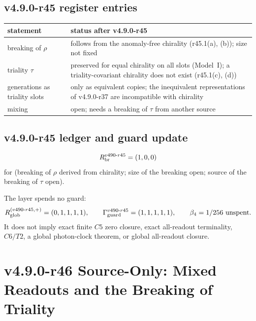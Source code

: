 \subsection*{v4.9.0-r45 register entries}
\label{subsec:v490-r45-register}

\begin{center}
\small
\begin{tabular}{@{}>{\raggedright\arraybackslash}p{}>{\raggedright\arraybackslash}p{}@{}}
\toprule
statement & status after v4.9.0-r45\\
\midrule
breaking of \(\rho\) & follows from the anomaly-free chirality (r45.1(a), (b)); size not fixed\\
triality \(\tau\) & preserved for equal chirality on all slots (Model~I); a triality-covariant chirality does not exist (r45.1(c), (d))\\
generations as triality slots & only as equivalent copies; the inequivalent representations of v4.9.0-r37 are incompatible with chirality\\
mixing & open; needs a breaking of \(\tau\) from another source\\
\bottomrule
\end{tabular}
\end{center}

\subsection*{v4.9.0-r45 ledger and guard update}
\label{subsec:v490-r45-ledger-guard}

\[
R_{\rm br}^{v490\text{-}r45}=(1,0,0)
\]
for (breaking of \(\rho\) derived from chirality; size of the breaking open; source of the breaking of \(\tau\) open).

The layer spends no guard:
\[
R_{\rm glob}^{(v490\text{-}r45,+)}=(0,1,1,1,1),
\qquad
\Gamma_{\rm guard}^{v490\text{-}r45}=(1,1,1,1,1),
\qquad
\beta_4=1/256\ \text{unspent}.
\]
It does not imply exact finite \(C5\) zero closure, exact all-readout terminality,
\(C6/T2\), a global photon-clock theorem, or global all-readout closure.
\clearpage
\section*{v4.9.0-r46 Source-Only: Mixed Readouts and the Breaking of Triality}
\label{sec:v490-r46-readouts-triality-breaking}


